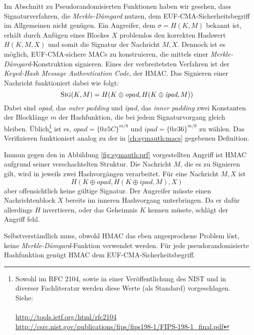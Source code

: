 Im Abschnitt zu Pseudorandomisierten Funktionen haben wir gesehen, dass Signaturverfahren, die \emph{Merkle-Dåmgard} nutzen,
dem EUF-CMA-Sicherheitsbegriff im Allgemeinen nicht genügen. Ein Angreifer, dem $\sigma = H(K,M)$ bekannt ist, erhält durch Anfügen eines Blockes $X$ problemlos den korrekten Hashwert $H(K,M,X)$ und somit die Signatur der Nachricht $M,X$.
Dennoch ist es möglich, EUF-CMA-sichere MACs zu konstruieren, die mittels einer \emph{Merkle-Dåmgard}-Konstruktion signieren.
Eines der verbreitetsten Verfahren ist der \textit{Keyed-Hash Message Authentication Code}, der HMAC. Das Signieren einer Nachricht
funktioniert dabei wie folgt:
\begin{equation*}
\textsc{Sig}(K,M) = H(K \oplus \textit{opad}, H(K \oplus \textit{ipad}, M))
\end{equation*}
Dabei sind \textit{opad}, das \textit{outer padding} und \textit{ipad}, das \textit{inner padding} zwei Konstanten der Blocklänge $m$ der Hashfunktion, die bei jedem Signaturvorgang gleich bleiben. Üblich\footnote{Sowohl im RFC 2104, sowie in einer Veröffentlichung des NIST und in diverser Fachliteratur werden diese Werte (als Standard) vorgeschlagen. Siehe: ~\\~\\ \url{http://tools.ietf.org/html/rfc2104} \\ \url{http://csrc.nist.gov/publications/fips/fips198-1/FIPS-198-1_final.pdf}} ist es, $\textit{opad} = \{0x5C\}^{m/8}$ und $\textit{ipad} = \{0x36\}^{m/8}$ zu wählen. Das Verifizieren funktioniert analog zu der in \ref{ch:symauth:macs} gegebenen Definition.

Immun gegen den in Abbildung \ref{fig:symauth:prf} vorgestellten Angriff ist HMAC aufgrund seiner verschachtelten Struktur. Die Nachricht
$M$, die es zu Signieren gilt, wird in jeweils zwei Hashvorgängen verarbeitet. Für eine Nachricht $M,X$ ist 
\begin{equation*}
H(K \oplus \textit{opad}, H(K \oplus \textit{ipad}, M), X)
\end{equation*} 
aber offensichtlich keine gültige Signatur. Der Angreifer müsste einen Nachrichtenblock $X$ bereits im inneren Hashvorgang unterbringen. Da er dafür allerdings $H$ invertieren, oder das Geheimnis $K$ kennen müsste, schlägt der Angriff fehl. 

Selbstverständlich muss, obwohl HMAC das eben angesprochene Problem löst, keine \textit{Merkle-Dåmgard}-Funktion verwendet werden. Für jede pseudorandomisierte Hashfunktion genügt HMAC dem EUF-CMA-Sicherheitsbegriff.